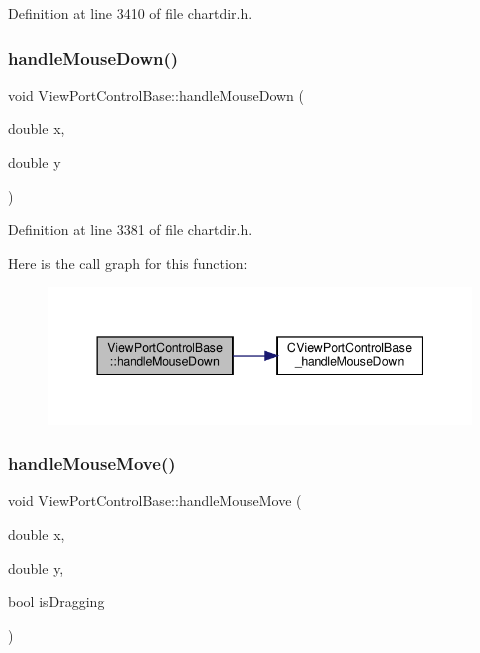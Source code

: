 Definition at line 3410 of file chartdir.\+h.

\mbox{\label{class_view_port_control_base_a7774f9a3b5f0197ea9f4cb91caf83a52}} 
\subsubsection{\texorpdfstring{handle\+Mouse\+Down()}{handleMouseDown()}}
{\footnotesize\ttfamily void View\+Port\+Control\+Base\+::handle\+Mouse\+Down (\begin{DoxyParamCaption}\item[{double}]{x,  }\item[{double}]{y }\end{DoxyParamCaption})\hspace{0.3cm}{\ttfamily [inline]}}



Definition at line 3381 of file chartdir.\+h.

Here is the call graph for this function\+:
\nopagebreak
\begin{figure}[H]
\begin{center}
\leavevmode
\includegraphics[width=344pt]{class_view_port_control_base_a7774f9a3b5f0197ea9f4cb91caf83a52_cgraph}
\end{center}
\end{figure}
\mbox{\label{class_view_port_control_base_ab7bf3d47eb60524b9ba3a4506ebc9345}} 
\subsubsection{\texorpdfstring{handle\+Mouse\+Move()}{handleMouseMove()}}
{\footnotesize\ttfamily void View\+Port\+Control\+Base\+::handle\+Mouse\+Move (\begin{DoxyParamCaption}\item[{double}]{x,  }\item[{double}]{y,  }\item[{bool}]{is\+Dragging }\end{DoxyParamCaption})\hspace{0.3cm}{\ttfamily [inline]}}



